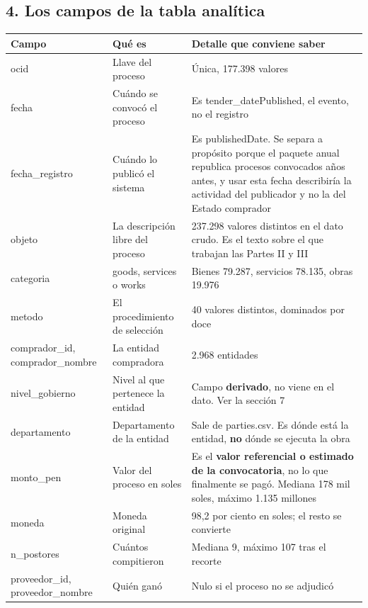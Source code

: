 \documentclass[11pt]{article}
\begin{document}
\subsection*{4. Los campos de la tabla analítica}
\begin{center}\footnotesize
\begin{tabularx}{\linewidth}{Q{0.454}Q{0.534}Q{2.011}}
\toprule
\textbf{Campo} & \textbf{Qué es} & \textbf{Detalle que conviene saber} \\
\midrule
ocid & Llave del proceso & Única, 177.398 valores \\
fecha & Cuándo se convocó el proceso & Es tender\_\allowbreak{}datePublished, el evento, no el registro \\
fecha\_\allowbreak{}registro & Cuándo lo publicó el sistema & Es publishedDate. Se separa a propósito porque el paquete anual republica procesos convocados años antes, y usar esta fecha describiría la actividad del publicador y no la del Estado comprador \\
objeto & La descripción libre del proceso & 237.298 valores distintos en el dato crudo. Es el texto sobre el que trabajan las Partes II y III \\
categoria & goods, services o works & Bienes 79.287, servicios 78.135, obras 19.976 \\
metodo & El procedimiento de selección & 40 valores distintos, dominados por doce \\
comprador\_\allowbreak{}id, comprador\_\allowbreak{}nombre & La entidad compradora & 2.968 entidades \\
nivel\_\allowbreak{}gobierno & Nivel al que pertenece la entidad & Campo \textbf{derivado}, no viene en el dato. Ver la sección 7 \\
departamento & Departamento de la entidad & Sale de parties.csv. Es dónde está la entidad, \textbf{no} dónde se ejecuta la obra \\
monto\_\allowbreak{}pen & Valor del proceso en soles & Es el \textbf{valor referencial o estimado de la convocatoria}, no lo que finalmente se pagó. Mediana 178 mil soles, máximo 1.135 millones \\
moneda & Moneda original & 98,2 por ciento en soles; el resto se convierte \\
n\_\allowbreak{}postores & Cuántos compitieron & Mediana 9, máximo 107 tras el recorte \\
proveedor\_\allowbreak{}id, proveedor\_\allowbreak{}nombre & Quién ganó & Nulo si el proceso no se adjudicó \\

\end{tabularx}
\end{center}
\end{document}
